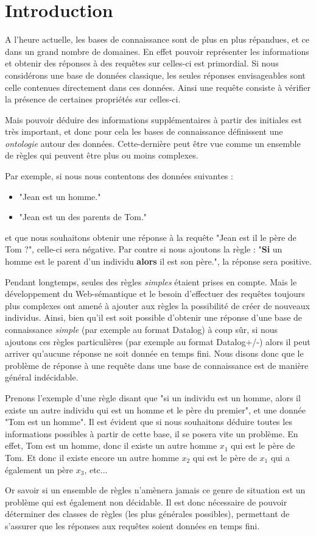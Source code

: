 
\section{Introduction}
A l'heure actuelle, les bases de connaissance sont de plus en plus répandues, et ce dans
un grand nombre de domaines.
En effet pouvoir représenter les informations et obtenir des réponses à des requêtes sur
celles-ci est primordial.
Si nous considérons une base de données classique, les seules réponses envisageables sont
celle contenues directement dans ces données.
Ainsi une requête consiste à vérifier la présence de certaines propriétés sur celles-ci.

Mais pouvoir déduire des informations supplémentaires à partir des initiales est très
important, et donc pour cela les bases de connaissance définissent une {\em ontologie}
autour des données.
Cette-dernière peut être vue comme un ensemble de règles qui peuvent être plus ou moins
complexes.

Par exemple, si nous nous contentons des données suivantes :
\begin{itemize}
	\item "Jean est un homme."
	\item "Jean est un des parents de Tom."
\end{itemize}
et que nous souhaitons obtenir une réponse à la requête "Jean est il le père de Tom ?",
celle-ci sera négative.
Par contre si nous ajoutons la règle : "{\bf Si} un homme est le parent d'un individu
{\bf alors} il est son père.", la réponse sera positive.

Pendant longtemps, seules des règles {\em simples} étaient prises en compte. Mais le
développement du Web-sémantique et le besoin d'effectuer des requêtes toujours plus
complexes ont amené à ajouter aux règles la possibilité de créer de nouveaux individus.
Ainsi, bien qu'il est soit possible d'obtenir une réponse d'une base de connaissance {\em simple} (par exemple
au format Datalog) à coup sûr, si nous ajoutons ces règles particulières (par exemple au
format Datalog+/-) alors il peut
arriver qu'aucune réponse ne soit donnée en temps fini.
Nous disons donc que le problème de réponse à une requête dans une base de connaissance
est de manière général indécidable.

Prenons l'exemple d'une règle disant que "si un individu est un homme, alors il existe un
autre individu qui est un homme et le père du premier", et une donnée "Tom est un homme".
Il est évident que si nous souhaitons déduire toutes les informations possibles à partir
de cette base, il se posera vite un problème.
En effet, Tom est un homme, donc il existe un autre homme $x_1$ qui est le père de Tom.
Et donc il existe encore un autre homme $x_2$ qui est le père de $x_1$ qui a également un
père $x_3$, etc...

Or savoir si un ensemble de règles n'amènera jamais ce genre de situation est un problème
qui est également non décidable.
Il est donc nécessaire de pouvoir déterminer des classes de règles (les plus générales
possibles), permettant de s'assurer que les réponses aux requêtes soient données en temps
fini. 



